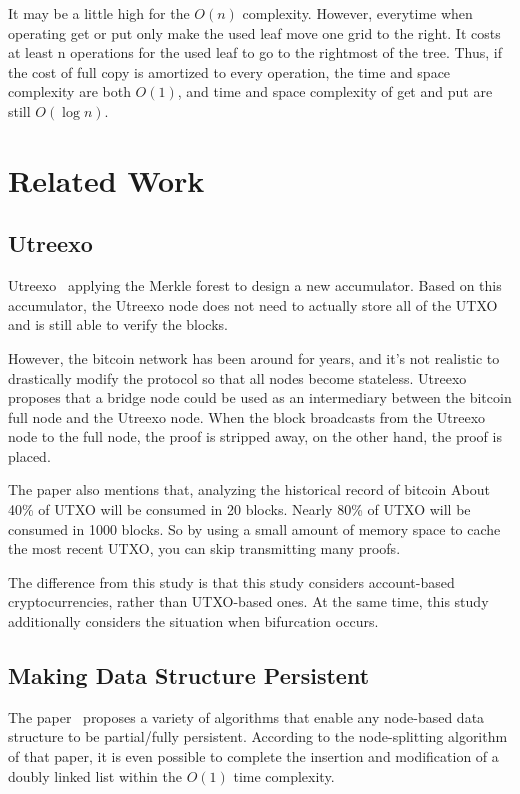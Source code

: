 \documentclass[conference]{IEEEtran}
\begin{document}
It may be a little high for the $O(n)$ complexity.
However, everytime when operating get or put only
make the used leaf move one grid to the right.
It costs  at least n operations for the used leaf
to go to the rightmost of the tree. Thus, if the
cost of full copy is amortized to every operation,
the time and space complexity are both $O(1)$,
and time and space complexity of get and put are still $O(\log n)$.


\section{Related Work}
\subsection{Utreexo}
Utreexo~\cite{b1} applying the Merkle forest to  design a new accumulator.
Based on this accumulator, the Utreexo node does not need to actually store all of the UTXO and is still able to verify the blocks.

However, the bitcoin network has been around for years, and it's not realistic to drastically modify the protocol so that all nodes become stateless.
Utreexo proposes that a bridge node could be used as an intermediary between the bitcoin full node and the Utreexo node.
When the block broadcasts from the Utreexo node to the full node, the proof is stripped away, on the other hand, the proof is placed.

The paper also mentions that, analyzing the historical record of bitcoin
About 40\% of UTXO will be consumed in 20 blocks.
Nearly 80\% of UTXO will be consumed in 1000 blocks.
So by using a small amount of memory space to cache the most recent UTXO, you can skip transmitting many proofs.

The difference from this study is that this study considers account-based cryptocurrencies, rather than UTXO-based ones.
At the same time, this study additionally considers the situation when bifurcation occurs.

\subsection{Making Data Structure Persistent}

The paper~\cite{b2} proposes a variety of algorithms that enable any node-based data structure to be partial/fully persistent.
According to the node-splitting algorithm of that paper, it is even possible to complete the insertion and modification of a doubly linked list within the $O(1)$ time complexity.
\end{document}
